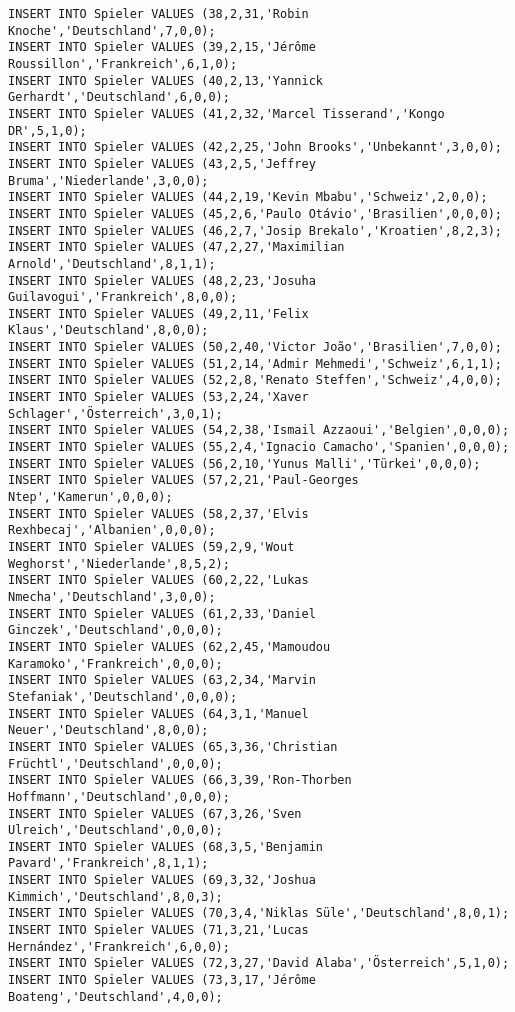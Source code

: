 \documentclass{lehramt-informatik-aufgabe}
\begin{document}
\begin{verbatim}
INSERT INTO Spieler VALUES (38,2,31,'Robin Knoche','Deutschland',7,0,0);
INSERT INTO Spieler VALUES (39,2,15,'Jérôme Roussillon','Frankreich',6,1,0);
INSERT INTO Spieler VALUES (40,2,13,'Yannick Gerhardt','Deutschland',6,0,0);
INSERT INTO Spieler VALUES (41,2,32,'Marcel Tisserand','Kongo DR',5,1,0);
INSERT INTO Spieler VALUES (42,2,25,'John Brooks','Unbekannt',3,0,0);
INSERT INTO Spieler VALUES (43,2,5,'Jeffrey Bruma','Niederlande',3,0,0);
INSERT INTO Spieler VALUES (44,2,19,'Kevin Mbabu','Schweiz',2,0,0);
INSERT INTO Spieler VALUES (45,2,6,'Paulo Otávio','Brasilien',0,0,0);
INSERT INTO Spieler VALUES (46,2,7,'Josip Brekalo','Kroatien',8,2,3);
INSERT INTO Spieler VALUES (47,2,27,'Maximilian Arnold','Deutschland',8,1,1);
INSERT INTO Spieler VALUES (48,2,23,'Josuha Guilavogui','Frankreich',8,0,0);
INSERT INTO Spieler VALUES (49,2,11,'Felix Klaus','Deutschland',8,0,0);
INSERT INTO Spieler VALUES (50,2,40,'Victor João','Brasilien',7,0,0);
INSERT INTO Spieler VALUES (51,2,14,'Admir Mehmedi','Schweiz',6,1,1);
INSERT INTO Spieler VALUES (52,2,8,'Renato Steffen','Schweiz',4,0,0);
INSERT INTO Spieler VALUES (53,2,24,'Xaver Schlager','Österreich',3,0,1);
INSERT INTO Spieler VALUES (54,2,38,'Ismail Azzaoui','Belgien',0,0,0);
INSERT INTO Spieler VALUES (55,2,4,'Ignacio Camacho','Spanien',0,0,0);
INSERT INTO Spieler VALUES (56,2,10,'Yunus Malli','Türkei',0,0,0);
INSERT INTO Spieler VALUES (57,2,21,'Paul-Georges Ntep','Kamerun',0,0,0);
INSERT INTO Spieler VALUES (58,2,37,'Elvis Rexhbecaj','Albanien',0,0,0);
INSERT INTO Spieler VALUES (59,2,9,'Wout Weghorst','Niederlande',8,5,2);
INSERT INTO Spieler VALUES (60,2,22,'Lukas Nmecha','Deutschland',3,0,0);
INSERT INTO Spieler VALUES (61,2,33,'Daniel Ginczek','Deutschland',0,0,0);
INSERT INTO Spieler VALUES (62,2,45,'Mamoudou Karamoko','Frankreich',0,0,0);
INSERT INTO Spieler VALUES (63,2,34,'Marvin Stefaniak','Deutschland',0,0,0);
INSERT INTO Spieler VALUES (64,3,1,'Manuel Neuer','Deutschland',8,0,0);
INSERT INTO Spieler VALUES (65,3,36,'Christian Früchtl','Deutschland',0,0,0);
INSERT INTO Spieler VALUES (66,3,39,'Ron-Thorben Hoffmann','Deutschland',0,0,0);
INSERT INTO Spieler VALUES (67,3,26,'Sven Ulreich','Deutschland',0,0,0);
INSERT INTO Spieler VALUES (68,3,5,'Benjamin Pavard','Frankreich',8,1,1);
INSERT INTO Spieler VALUES (69,3,32,'Joshua Kimmich','Deutschland',8,0,3);
INSERT INTO Spieler VALUES (70,3,4,'Niklas Süle','Deutschland',8,0,1);
INSERT INTO Spieler VALUES (71,3,21,'Lucas Hernández','Frankreich',6,0,0);
INSERT INTO Spieler VALUES (72,3,27,'David Alaba','Österreich',5,1,0);
INSERT INTO Spieler VALUES (73,3,17,'Jérôme Boateng','Deutschland',4,0,0);

\end{verbatim}
\end{document}
